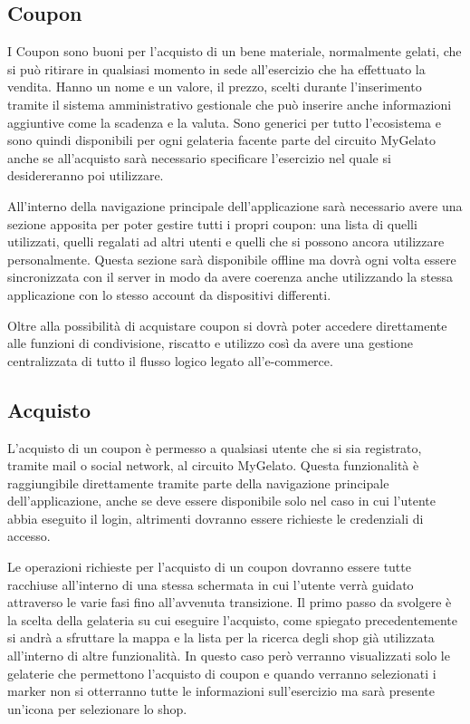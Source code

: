 \subsection{Coupon}

I Coupon sono buoni per l'acquisto di un bene materiale, normalmente
gelati, che si può ritirare in qualsiasi momento in sede all'esercizio
che ha effettuato la vendita. Hanno un nome e un valore, il prezzo,
scelti durante l'inserimento tramite il sistema amministrativo gestionale
che può inserire anche informazioni aggiuntive come la scadenza e
la valuta. Sono generici per tutto l'ecosistema e sono quindi disponibili
per ogni gelateria facente parte del circuito MyGelato anche se all'acquisto
sarà necessario specificare l'esercizio nel quale si desidereranno
poi utilizzare.\bigskip{}

All'interno della navigazione principale dell'applicazione sarà necessario
avere una sezione apposita per poter gestire tutti i propri coupon:
una lista di quelli utilizzati, quelli regalati ad altri utenti e
quelli che si possono ancora utilizzare personalmente. Questa sezione
sarà disponibile offline ma dovrà ogni volta essere sincronizzata
con il server in modo da avere coerenza anche utilizzando la stessa
applicazione con lo stesso account da dispositivi differenti.\bigskip{}

Oltre alla possibilità di acquistare coupon si dovrà poter accedere
direttamente alle funzioni di condivisione, riscatto e utilizzo così
da avere una gestione centralizzata di tutto il flusso logico legato
all'e-commerce.

\subsection{Acquisto}

L'acquisto di un coupon è permesso a qualsiasi utente che si sia registrato,
tramite mail o social network, al circuito MyGelato. Questa funzionalità
è raggiungibile direttamente tramite parte della navigazione principale
dell'applicazione, anche se deve essere disponibile solo nel caso
in cui l'utente abbia eseguito il login, altrimenti dovranno essere
richieste le credenziali di accesso.\bigskip{}

Le operazioni richieste per l'acquisto di un coupon dovranno essere
tutte racchiuse all'interno di una stessa schermata in cui l'utente
verrà guidato attraverso le varie fasi fino all'avvenuta transizione.
Il primo passo da svolgere è la scelta della gelateria su cui eseguire
l'acquisto, come spiegato precedentemente si andrà a sfruttare la
mappa e la lista per la ricerca degli shop già utilizzata all'interno
di altre funzionalità. In questo caso però verranno visualizzati solo
le gelaterie che permettono l'acquisto di coupon e quando verranno
selezionati i marker non si otterranno tutte le informazioni sull'esercizio
ma sarà presente un'icona per selezionare lo shop.\bigskip{}

